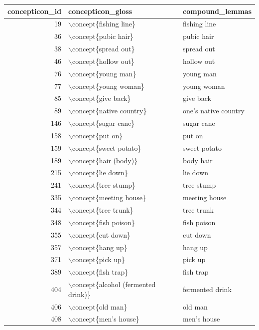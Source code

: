 \begin{table}[ht]
\centering
\begin{tabular}{rll}
  \hline
concepticon\_id & concepticon\_gloss & compound\_lemmas \\ 
  \hline
19 & $\backslash$concept\{fishing line\} & fishing line \\ 
  36 & $\backslash$concept\{pubic hair\} & pubic hair \\ 
  38 & $\backslash$concept\{spread out\} & spread out \\ 
  46 & $\backslash$concept\{hollow out\} & hollow out \\ 
  76 & $\backslash$concept\{young man\} & young man \\ 
  77 & $\backslash$concept\{young woman\} & young woman \\ 
  85 & $\backslash$concept\{give back\} & give back \\ 
  89 & $\backslash$concept\{native country\} & one's native country \\ 
  146 & $\backslash$concept\{sugar cane\} & sugar cane \\ 
  158 & $\backslash$concept\{put on\} & put on \\ 
  159 & $\backslash$concept\{sweet potato\} & sweet potato \\ 
  189 & $\backslash$concept\{hair (body)\} & body hair \\ 
  215 & $\backslash$concept\{lie down\} & lie down \\ 
  241 & $\backslash$concept\{tree stump\} & tree stump \\ 
  335 & $\backslash$concept\{meeting house\} & meeting house \\ 
  344 & $\backslash$concept\{tree trunk\} & tree trunk \\ 
  348 & $\backslash$concept\{fish poison\} & fish poison \\ 
  355 & $\backslash$concept\{cut down\} & cut down \\ 
  357 & $\backslash$concept\{hang up\} & hang up \\ 
  371 & $\backslash$concept\{pick up\} & pick up \\ 
  389 & $\backslash$concept\{fish trap\} & fish trap \\ 
  404 & $\backslash$concept\{alcohol (fermented drink)\} & fermented drink \\ 
  406 & $\backslash$concept\{old man\} & old man \\ 
  408 & $\backslash$concept\{men's house\} & men's house \\ 

\end{tabular}
\end{table}
